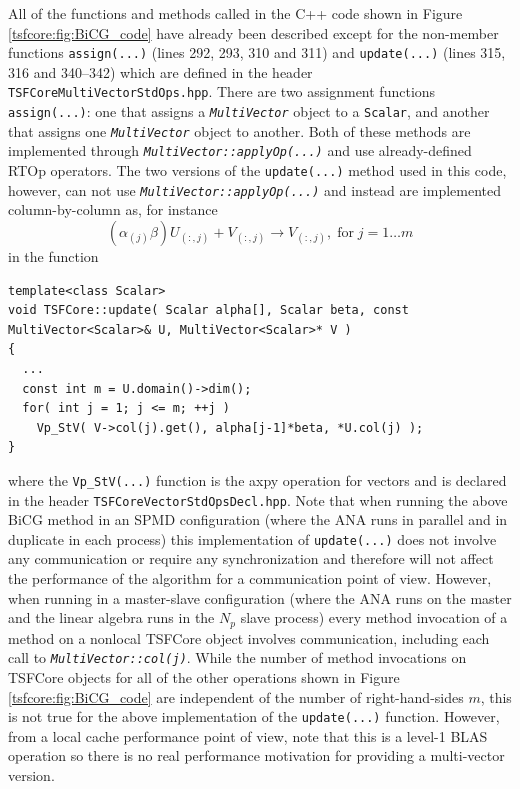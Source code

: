 %
All of the functions and methods called in the C++ code shown in
Figure {}\ref{tsfcore:fig:BiCG_code} have already been described
except for the non-member functions {}\texttt{assign(...)} (lines 292,
293, 310 and 311) and {}\texttt{update(...)} (lines 315, 316 and
340--342) which are defined in the header
{}\texttt{TSFCore\-Multi\-Vector\-Std\-Ops.hpp}.  There are two
assignment functions {}\texttt{assign(...)}: one that assigns a
{}\texttt{\textit{Multi\-Vector}} object to a {}\texttt{Scalar}, and
another that assigns one {}\texttt{\textit{Multi\-Vector}} object to
another.  Both of these methods are implemented through
{}\texttt{\textit{Multi\-Vector\-::applyOp(\-...)}} and use
already-defined RTOp operators.  The two versions of the
{}\texttt{update(...)} method used in this code, however, can not use
{}\texttt{\textit{Multi\-Vector\-::applyOp(\-...)}} and instead are
implemented column-by-column as, for instance
%
\[
(\alpha_{(j)} \beta) U_{(:,j)} + V_{(:,j)} \rightarrow V_{(:,j)}, \; \mbox{for} \; j = 1 \ldots m
\]
%
in the function

{\scriptsize\begin{verbatim}
template<class Scalar>
void TSFCore::update( Scalar alpha[], Scalar beta, const MultiVector<Scalar>& U, MultiVector<Scalar>* V )
{
  ...
  const int m = U.domain()->dim();
  for( int j = 1; j <= m; ++j )
    Vp_StV( V->col(j).get(), alpha[j-1]*beta, *U.col(j) );
}
\end{verbatim}}

{}\noindent{}where the {}\texttt{Vp\_StV(...)} function is the axpy
operation for vectors and is declared in the header
{}\texttt{TSFCore\-Vector\-StdOps\-Decl.hpp}.  Note that when running
the above BiCG method in an SPMD configuration (where the ANA runs in
parallel and in duplicate in each process) this implementation of
{}\texttt{update(...)} does not involve any communication or require
any synchronization and therefore will not affect the performance of
the algorithm for a communication point of view.  However, when
running in a master-slave configuration (where the ANA runs on the
master and the linear algebra runs in the $N_p$ slave process) every
method invocation of a method on a nonlocal TSFCore object involves
communication, including each call to
{}\texttt{\textit{Multi\-Vector\-::col(j)}}.  While the number of
method invocations on TSFCore objects for all of the other operations
shown in Figure {}\ref{tsfcore:fig:BiCG_code} are independent of the
number of right-hand-sides $m$, this is not true for the above
implementation of the {}\texttt{update(...)} function.  However, from
a local cache performance point of view, note that this is a level-1
BLAS operation so there is no real performance motivation for
providing a multi-vector version.

